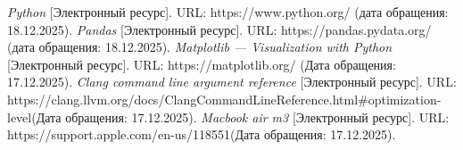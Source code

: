 \begin{thebibliography}{}
	\textit {Python} [Электронный ресурс]. URL: https://www.python.org/ (дата обращения: 18.12.2025).
	\textit {Pandas} [Электронный ресурс]. URL: https://pandas.pydata.org/ (дата обращения: 18.12.2025).
	\textit {Matplotlib --- Visualization with Python} [Электронный ресурс]. URL:  https://matplotlib.org/ (Дата обращения: 17.12.2025).
	\textit {Clang command line argument reference} [Электронный ресурс]. URL: https://clang.llvm.org/docs/ClangCommandLineReference.html\#optimization-level(Дата обращения: 17.12.2025).
	\textit {Macbook air m3} [Электронный ресурс]. URL: https://support.apple.com/en-us/118551(Дата обращения: 17.12.2025).
	
\end{thebibliography}

